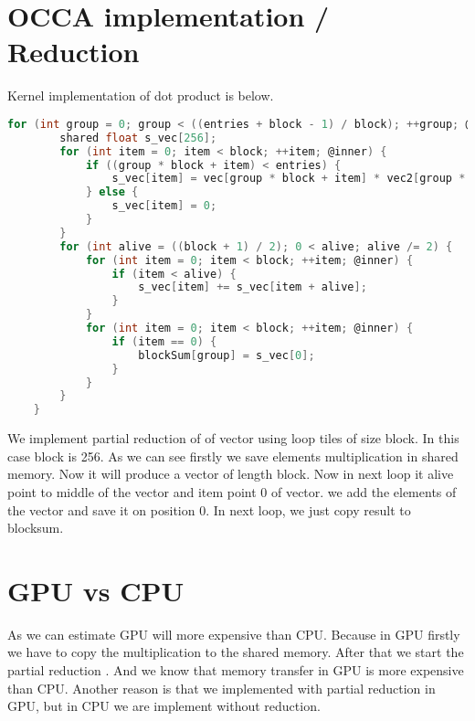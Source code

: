  	\section{OCCA implementation / Reduction}
 	Kernel implementation of dot product is below.
 	\begin{lstlisting}[language=C, caption=vector dot product in OCCA]
 for (int group = 0; group < ((entries + block - 1) / block); ++group; @outer) {
        shared float s_vec[256];
        for (int item = 0; item < block; ++item; @inner) {
            if ((group * block + item) < entries) {
                s_vec[item] = vec[group * block + item] * vec2[group * block + item];
            } else {
                s_vec[item] = 0;
            }
        }
		for (int alive = ((block + 1) / 2); 0 < alive; alive /= 2) {
            for (int item = 0; item < block; ++item; @inner) {
                if (item < alive) {
                    s_vec[item] += s_vec[item + alive];
                }
            }
            for (int item = 0; item < block; ++item; @inner) {
                if (item == 0) {
                    blockSum[group] = s_vec[0];
                }
            }
        }
    }
 	\end{lstlisting}
 	We implement partial reduction of of vector using loop tiles of size block. In this case block is 256. As we can see firstly we save elements multiplication in shared memory. Now it will produce a vector of length block. Now in next loop it alive point to middle of the vector and item point 0 of vector. we add the elements of the vector and save it on position 0. In next loop, we just copy result to blocksum. 
 	\section{GPU vs CPU}
 	As we can estimate GPU will more expensive than CPU. Because in GPU firstly we have to copy the multiplication to the  shared memory. After that we start the partial reduction . And we know that memory transfer in GPU is more expensive than CPU. Another reason is that we implemented with partial reduction in GPU, but in CPU we are implement without reduction. 
 	
